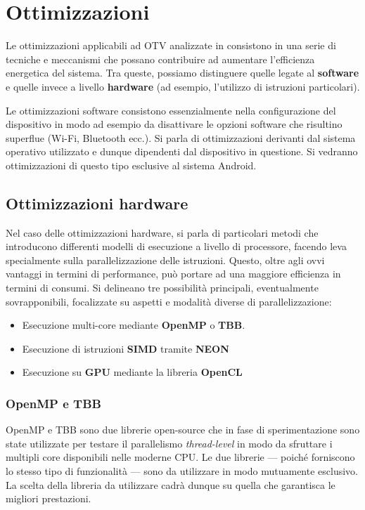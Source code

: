 \section{Ottimizzazioni}

Le ottimizzazioni applicabili ad OTV analizzate in \cite{rs12122047} consistono in una serie di tecniche e meccanismi che
possano contribuire ad aumentare l'efficienza energetica del sistema. %
Tra queste, possiamo distinguere quelle legate al \textbf{software} e quelle invece a livello \textbf{hardware} 
(ad esempio, l'utilizzo di istruzioni particolari).

Le ottimizzazioni software consistono essenzialmente nella configurazione del dispositivo in modo ad esempio
da disattivare le opzioni software che risultino superflue (Wi-Fi, Bluetooth ecc.). Si parla di ottimizzazioni derivanti dal
sistema operativo utilizzato e dunque dipendenti dal dispositivo in questione. Si vedranno ottimizzazioni di questo tipo
esclusive al sistema Android.

\subsection{Ottimizzazioni hardware}

Nel caso delle ottimizzazioni hardware, si parla di particolari metodi che introducono differenti modelli di esecuzione
a livello di processore, facendo leva specialmente sulla parallelizzazione delle istruzioni. Questo, oltre agli ovvi vantaggi
in termini di performance, può portare ad una maggiore efficienza in termini di consumi.
Si delineano tre possibilità principali, eventualmente sovrapponibili, focalizzate su aspetti e modalità diverse di 
parallelizzazione:
\begin{itemize}
    \item Esecuzione multi-core mediante \textbf{OpenMP} o \textbf{TBB}. 
    \item Esecuzione di istruzioni \textbf{SIMD} tramite \textbf{NEON}
    \item Esecuzione su \textbf{GPU} mediante la libreria \textbf{OpenCL}
\end{itemize}

\subsubsection{OpenMP e TBB}

OpenMP e TBB sono due librerie open-source che in fase di sperimentazione sono state utilizzate per testare il parallelismo
\emph{thread-level} in modo da sfruttare i multipli core disponibili nelle moderne CPU. Le due librerie --- poiché
forniscono lo stesso tipo di funzionalità --- sono da utilizzare in modo mutuamente esclusivo. La scelta della 
libreria da utilizzare cadrà dunque su quella che garantisca le migliori prestazioni.

